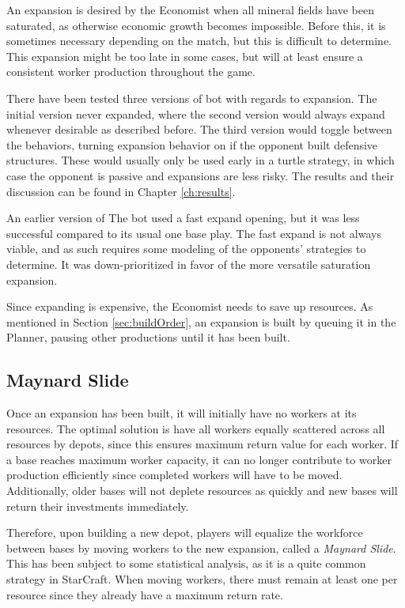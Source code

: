 	An expansion is desired by the Economist when all mineral fields have been saturated, as otherwise economic growth becomes impossible. Before this, it is sometimes necessary depending on the match, but this is difficult to determine. This expansion might be too late in some cases, but will at least ensure a consistent worker production throughout the game.

	There have been tested three versions of bot with regards to expansion. The initial version never expanded, where the second version would always expand whenever desirable as described before. The third version would toggle between the behaviors, turning expansion behavior on if the opponent built defensive structures. These would usually only be used early in a turtle strategy, in which case the opponent is passive and expansions are less risky. The results and their discussion can be found in Chapter \ref{ch:results}.

	An earlier version of The bot used a fast expand opening, but it was less successful compared to its usual one base play. The fast expand is not always viable, and as such requires some modeling of the opponents' strategies to determine. It was down-prioritized in favor of the more versatile saturation expansion.
	
	Since expanding is expensive, the Economist needs to save up resources. As mentioned in Section \ref{sec:buildOrder}, an expansion is built by queuing it in the Planner, pausing other productions until it has been built.
	
	\subsection*{Maynard Slide}
	Once an expansion has been built, it will initially have no workers at its resources. The optimal solution is have all workers equally scattered across all resources by depots, since this ensures maximum return value for each worker. If a base reaches maximum worker capacity, it can no longer contribute to worker production efficiently since completed workers will have to be moved. Additionally, older bases will not deplete resources as quickly and new bases will return their investments immediately.
	
	Therefore, upon building a new depot, players will equalize the workforce between bases by moving workers to the new expansion, called a \emph{Maynard Slide}. This has been subject to some statistical analysis, as it is a quite common strategy in StarCraft. When moving workers, there must remain at least one per resource since they already have a maximum return rate.
	
